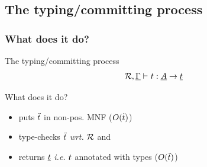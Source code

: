 \documentclass[ignorenonframetext,red]{beamer}
\begin{document}
\subsection{The typing/committing process}

\subsubsection{What does it do?}

\begin{frame}{The typing/committing process}
  \inXLF
  {\Large
  \[
  \jannt\mr\me\mo\mf\mo
  \]}
  \begin{block}{What does it do?}
    \begin{itemize}
    \item puts $\ddot{t}$ in non-pos. \textsf{MNF} ($O(\ddot{t})$)
    \item type-checks $\ddot{t}$ \emph{wrt.} $\inXLFa\mr$ and
    \item returns $\inXLFa\mo$ \emph{i.e.} $\inXLF\mo$ annotated with types ($O(\ddot{t})$)
    \end{itemize}
  \end{block}
\end{frame}
\end{document}
